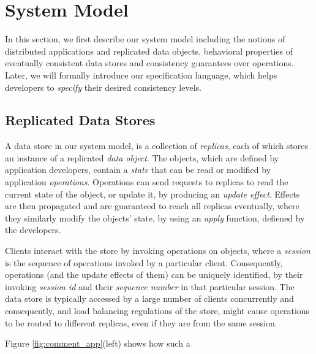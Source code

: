 \newpage
\section{System Model}
In this section, we first describe our system model including the
notions of distributed applications and replicated data objects,
behavioral properties of eventually consistent data stores and consistency guarantees
over operations. Later, we will formally introduce our specification
language, which helps developers to \emph{specify} their desired consistency
levels. 
%
\subsection{Replicated Data Stores}
\label{subsec:repl_types}
A data store in our system model, is a collection of \emph{replicas},
each of which stores an instance of a replicated \emph{data object}.
The objects,
which are defined by application developers, contain a \emph{state} that
can be read or modified by application \emph{operations}.
Operations can send requests to replicas to read the current state of the object, or
update it, by producing an \emph{update effect}. 
Effects are then propagated and are guaranteed to reach all replicas
eventually, where they similarly modify the objects' state,
by using an \emph{apply} function, defiened by the developers.

Clients interact
with the store by invoking operations on objects, where a \emph{session} is
the sequence of operations invoked by a particular client. Consequently,
operations
(and the update effects of them) can be uniquely identified, by
their invoking \emph{session id} and their \emph{sequence number} in
that particular session. The data store is typically accessed by a large
number of clients concurrently and consequently, and load balancing
regulations of the store, might cause operations to be routed to different replicas,
even if they are from the same session.

Figure \ref{fig:comment_app}(left) shows how such a  












